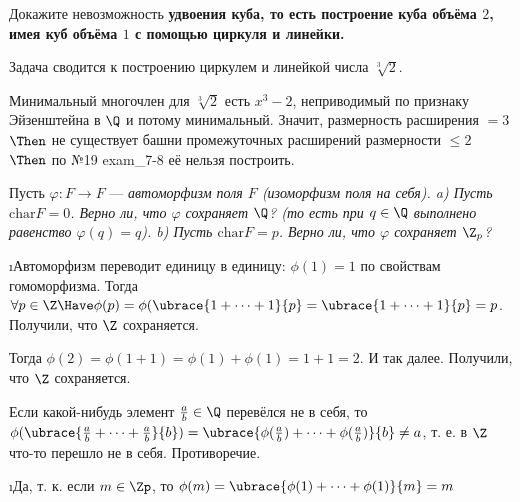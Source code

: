 \begin{problem}[39 (9.12а)]
Докажите невозможность \bf{удвоения куба}, то есть построение куба объёма $2$, имея куб объёма $1$ с помощью циркуля и линейки.
\end{problem}

\begin{solution}
Задача сводится к построению циркулем и линейкой числа \(\sqrt[3]{2}\).

Минимальный многочлен для $\sqrt[3]{2}$ есть $x^3 - 2$, неприводимый по признаку Эйзенштейна в $\Q$ и потому минимальный.
Значит, размерность расширения $= 3$ $\Then$ не существует башни промежуточных расширений размерности $\le 2$ $\Then$ по №19 exam\_7-8 её нельзя построить.

\end{solution}

\begin{problem}[40 (10.2)]
Пусть $\varphi: F \to F$ --- \it{автоморфизм поля} $F$ (изоморфизм поля на себя). 
a) Пусть $\mathrm{char} F =0$. Верно ли, что $\varphi$ сохраняет $\Q$? (то есть при $q\in\Q$ выполнено равенство $\varphi(q)=q$).
b) Пусть $\mathrm{char} F =p$. Верно ли, что $\varphi$ сохраняет $\Z_p$?
\end{problem}

\begin{solution}
\begin{enumerate}[label=\asbuk{enumi})]
\i Автоморфизм переводит единицу в единицу: \(\phi(1) = 1\) по свойствам гомоморфизма.
Тогда \(\forall p \in \Z \Have \phi(p) = \phi(\ubrace{1+\dots+1}{p} = \ubrace{1+\dots+1}{p} = p\). Получили, что \(\Z\) сохраняется.

Тогда $\phi(2) = \phi(1+1) = \phi(1)+\phi(1)=1+1=2$.
И так далее. Получили, что $\Z$ сохраняется.

Если какой-нибудь элемент $\frac{a}{b} \in \Q$ перевёлся не в себя, то $\phi(\ubrace{\frac{a}{b}+\dots+\frac{a}{b}}{b}) = \ubrace{\phi(\frac{a}{b})+\dots+\phi(\frac{a}{b})}{b} \ne a$, т. е. в $\Z$ что-то перешло не в себя. Противоречие.
%

\i Да, т. к. если \(m \in \Zp\), то \(\phi(m) = \ubrace{\phi(1)+\dots+\phi(1)}{m} = m\)
\end{enumerate}
\end{solution}

